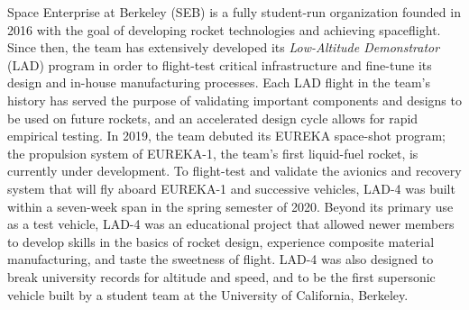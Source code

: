 Space Enterprise at Berkeley (SEB) is a fully student-run organization founded in 2016 with the goal of developing rocket technologies and achieving spaceflight. Since then, the team has extensively developed its \textit{Low-Altitude Demonstrator} (LAD) program in order to flight-test critical infrastructure and fine-tune its design and in-house manufacturing processes. Each LAD flight in the team’s history has served the purpose of validating important components and designs to be used on future rockets, and an accelerated design cycle allows for rapid empirical testing. In 2019, the team debuted its EUREKA space-shot program; the propulsion system of EUREKA-1, the team’s first liquid-fuel rocket, is currently under development. To flight-test and validate the avionics and recovery system that will fly aboard EUREKA-1 and successive vehicles, LAD-4 was built within a seven-week span in the spring semester of 2020. Beyond its primary use as a test vehicle, LAD-4 was an educational project that allowed newer members to develop skills in the basics of rocket design, experience composite material manufacturing, and taste the sweetness of flight. LAD-4 was also designed to break university records for altitude and speed, and to be the first supersonic vehicle built by a student team at the University of California, Berkeley.